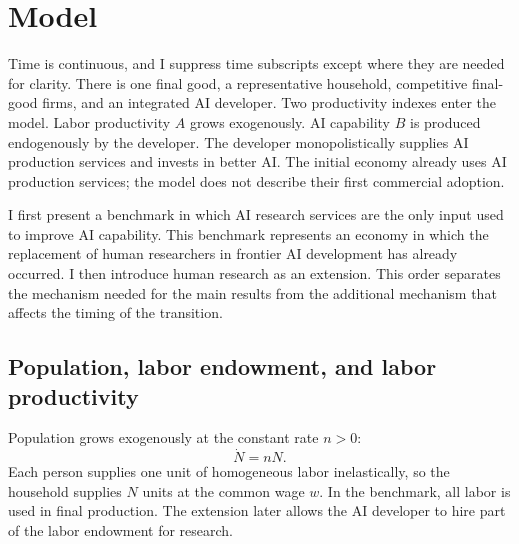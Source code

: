 \section{Model}
\label{sec:axm-model}

Time is continuous, and I suppress time subscripts except where they are needed
for clarity. There is one final good, a representative household, competitive
final-good firms, and an integrated AI developer. Two productivity indexes enter
the model. Labor productivity \(A\) grows exogenously. AI capability \(B\) is
produced endogenously by the developer. The developer monopolistically supplies
AI production services and invests in better AI. The initial economy already
uses AI production services; the model does not describe their first commercial
adoption.

I first present a benchmark in which AI research services are the only input
used to improve AI capability. This benchmark represents an economy in which
the replacement of human researchers in frontier AI development has already
occurred. I then introduce human research as an extension. This order separates
the mechanism needed for the main results from the additional mechanism that
affects the timing of the transition.


\subsection{Population, labor endowment, and labor productivity}

Population grows exogenously at the constant rate \(n>0\):
\begin{equation}
 \dot N=nN.
 \label{eq:axm-population}
\end{equation}
Each person supplies one unit of homogeneous labor inelastically, so the
household supplies \(N\) units at the common wage \(w\). In the benchmark, all
labor is used in final production. The extension later allows the AI developer
to hire part of the labor endowment for research.

